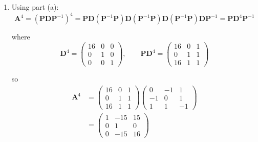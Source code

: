\documentclass[leqno]{article}
\begin{document}
\begin{enumerate}[
  label=\textbf{\arabic*.},
  leftmargin=*,
  topsep=0pt,
  partopsep=0pt,
  parsep=0pt
]
\begin{djsSolution}
\begin{enumerate}[label=\textbf{(\alph*)}, start=1]
Therefore
\begin{align*}
\mathbf{A}=\mathbf{P}\mathbf{D}\mathbf{P}^{-1}&=\begin{pmatrix} 2 & 0 & 1 \\ 0 & -1 & 1 \\ 2 & -1 & 1 \end{pmatrix}\begin{pmatrix} 0 & -1 & 1 \\ -1 & 0 & 1 \\ 1 & 1 & -1 \end{pmatrix}\\
&=\begin{pmatrix} 1 & -1 & 1 \\ 2 & 1 & -2 \\ 2 & -1 & 0 \end{pmatrix}
\end{align*}

  \item Using part (a):
\[
\mathbf{A}^4=\left(\mathbf{P}\mathbf{D}\mathbf{P}^{-1}\right)^4=\mathbf{P}\mathbf{D}\left(\mathbf{P}^{-1}\mathbf{P}\right)\mathbf{D}\left(\mathbf{P}^{-1}\mathbf{P}\right)\mathbf{D}\left(\mathbf{P}^{-1}\mathbf{P}\right)\mathbf{D}\mathbf{P}^{-1}=\mathbf{P}\mathbf{D}^4\mathbf{P}^{-1}
\]

where
\[
\mathbf{D}^4=\begin{pmatrix} 16 & 0 & 0 \\ 0 & 1 & 0 \\ 0 & 0 & 1 \end{pmatrix},\qquad \mathbf{P}\mathbf{D}^4=\begin{pmatrix} 16 & 0 & 1 \\ 0 & 1 & 1 \\ 16 & 1 & 1 \end{pmatrix}
\]

so
\begin{align*}
\mathbf{A}^4&=\begin{pmatrix} 16 & 0 & 1 \\ 0 & 1 & 1 \\ 16 & 1 & 1 \end{pmatrix}\begin{pmatrix} 0 & -1 & 1 \\ -1 & 0 & 1 \\ 1 & 1 & -1 \end{pmatrix}\\
&=\begin{pmatrix} 1 & -15 & 15 \\ 0 & 1 & 0 \\ 0 & -15 & 16 \end{pmatrix}
\end{align*}


\end{enumerate}
\end{djsSolution}
\end{enumerate}
\end{document}
